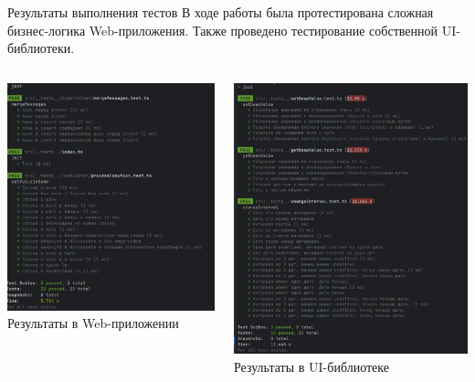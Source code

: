 \documentclass[aspectratio=169]{beamer}
\begin{document}
\begin{frame}{Результаты выполнения тестов}
\small
\justifying
В ходе работы была протестирована сложная бизнес-логика Web-приложения. Также проведено тестирование собственной UI-библиотеки.

\vspace{1em}

\begin{columns}
  \begin{column}{0.48\textwidth}
    \centering
    \includegraphics[width=0.8\linewidth]{static/ProjectTests.png} \\
    \small Результаты в Web-приложении
  \end{column}
  \begin{column}{0.48\textwidth}
    \centering
    \includegraphics[width=0.8\linewidth]{static/LibTests.png} \\
    \small Результаты в UI-библиотеке
  \end{column}
\end{columns}
\end{frame}
\end{document}
